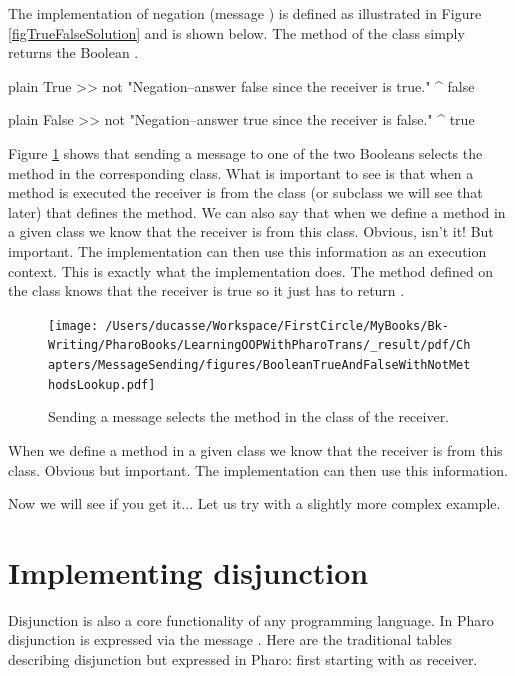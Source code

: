 \documentclass[10pt,twoside,english]{_support/latex/sbabook/sbabook}
\begin{document}
The implementation of negation (message ) is defined as illustrated in Figure \ref{figTrueFalseSolution} and is shown below. The method  of the class  simply returns the Boolean . 

\begin{displaycode}{plain}
True >> not
   "Negation--answer false since the receiver is true."
   ^ false
\end{displaycode}

\begin{displaycode}{plain}
False >> not
   "Negation--answer true since the receiver is false."
   ^ true
\end{displaycode}

Figure \ref{figTrueFalseSolutionLookup} shows that sending a message to one of the two Booleans selects the method in the corresponding class. What is important to see is that when a method is executed the receiver is from the class (or subclass we will see that later) that defines the method. We can also say that when we define a method in a given class we know that the receiver is from this class. Obvious, isn't it! But important. The implementation can then use this information as an execution context. This is exactly what the  implementation does. The method  defined on the class  knows that the receiver is true so it just has to return . 


\begin{figure}

\begin{center}
\texttt{[image: /Users/ducasse/Workspace/FirstCircle/MyBooks/Bk-Writing/PharoBooks/LearningOOPWithPharoTrans/\_result/pdf/Chapters/MessageSending/figures/BooleanTrueAndFalseWithNotMethodsLookup.pdf]}\caption{Sending a message selects the method in the class of the receiver.\label{figTrueFalseSolutionLookup}}\end{center}
\end{figure}


\begin{note}
When we define a method in a given class we know that the receiver is from this class. Obvious but important. The implementation can then use this information.
\end{note}

Now we will see if you get it... Let us try with a slightly more complex example.
\section{Implementing disjunction}
Disjunction is also a core functionality of any programming language. In Pharo disjunction is expressed via the message \textcode{\textbar{}}. 
 Here are the traditional tables describing disjunction but expressed in Pharo: first starting with  as receiver.
\end{document}
